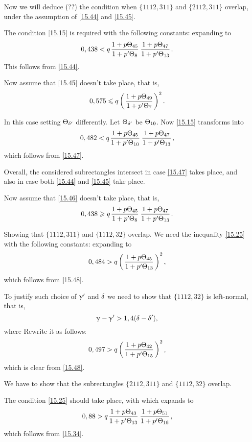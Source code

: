 Now we will deduce (??) the condition when $\{1112, 311\}$ and $\{2112, 311\}$ overlap,
under the assumption of \ref{15.44} and \ref{15.45}.

The condition \ref{15.15} is required with the following constants:
expanding to
\begin{equation}\label{15.46}
	0,438 < q \up{45}{8} \up{47}{13}.
\end{equation}
This follows from \ref{15.44}.

Now assume that \ref{15.45} doesn't take place, that is,
\begin{equation}\label{15.47}
	0,575 \leqslant q \left(\mkern 2mu \dfrac{1 + {p} \Theta_{49}}{1 + {p'} \Theta_{7}} \mkern 2mu\right)^2.
\end{equation}

In this case setting $\Theta_{\delta'}$ differently.
Let $\Theta_{\delta'}$ be $\Theta_{10}$. Now \ref{15.15} transforms into
\begin{equation*}
	0,482 < q \up{45}{10} \up{47}{13},
\end{equation*}
which follows from \ref{15.47}.

Overall, the considered subrectangles intersect in case \ref{15.47} takes place,
and also in case both \ref{15.44} and \ref{15.45} take place.

Now assume that \ref{15.46} doesn't take place, that is,
\begin{equation}\label{15.48}
	0,438 \geqslant q \up{45}{8} \up{47}{13}.
\end{equation}

Showing that $\{1112, 311\}$ and $\{1112, 32\}$ overlap.
We need the inequality \ref{15.25} with the following constants:
expanding to
\begin{equation*}
	0,484 > q \left(\mkern 2mu \dfrac{1 + {p} \Theta_{45}}{1 + {p'} \Theta_{13}} \mkern 2mu\right)^2,
\end{equation*}
which follows from \ref{15.48}.

To justify such choice of $\upgamma'$ and $\delta$ we need to show that $\{1112, 32\}$ is left-normal, that is,
\begin{equation*}
	\upgamma - \upgamma' > 1,4 (\delta - \delta'),
\end{equation*}
where
Rewrite it as follows:
\begin{equation*}
	0,497 > q \left(\mkern 2mu \dfrac{1 + {p} \Theta_{42}}{1 + {p'} \Theta_{15}} \mkern 2mu\right)^2,
\end{equation*}
which is clear from \ref{15.48}.

We have to show that the subrectangles $\{2112, 311\}$ and $\{1112, 32\}$ overlap.

The condition \ref{15.25} should take place, with
which expands to
\begin{equation*}
	0,88 > q \up{43}{13} \up{51}{16},
\end{equation*}
which follows from \ref{15.34}.

